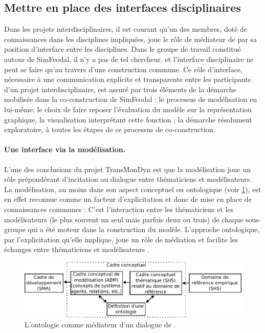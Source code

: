 \subsection{Mettre en place des interfaces disciplinaires\label{subsec:interfaces}}

Dans les projets interdisciplinaires, il est courant qu'un des membres, doté de connaissances dans les disciplines impliquées, joue le rôle de médiateur de par sa position d'interface entre les disciplines.
Dans le groupe de travail constitué autour de SimFeodal, il n'y a pas de tel chercheur, et l'interface disciplinaire ne peut se faire qu'au travers d'une construction commune.
Ce rôle d'interface, nécessaire à une communication explicite et transparente entre les participants d'un projet interdisciplinaire, est assuré par trois éléments de la démarche mobilisée dans la co-construction de SimFeodal :
le processus de modélisation en lui-même;
le choix de faire reposer l'évaluation du modèle sur la représentation graphique, la visualisation interprétant cette fonction ;
la démarche résolument exploratoire, à toutes les étapes de ce processus de co-construction.

\paragraph{Une interface via la modélisation.}

L'une des conclusions du projet TransMonDyn est que la modélisation joue un rôle prépondérant d'incitation au dialogue entre thématiciens et modélisateurs.
La modélisation, au moins dans son aspect conceptuel ou ontologique (voir \cref{fig:ontologie-mediateur}), est en effet reconnue comme un facteur d'explicitation et donc de mise en place de connaissances communes :
\og C'est l'interaction entre les thématiciens et les modélisateurs (le plus souvent un seul mais parfois deux ou trois) de chaque sous-groupe qui a été moteur dans la construction du modèle.
\textelp{}
L'approche ontologique, par l'explicitation qu'elle implique, joue un rôle de médiation et facilite les échanges entre thématiciens et modélisateurs \fg{} \autocite[458]{sanders_points_2018}.

\begin{figure}[H]
	\centering
	\includegraphics[width=\linewidth]{img/schema_phan.pdf}
	\caption{\og L'ontologie comme médiateur d'un dialogue \fg{} de \textcite[fig. 2.7, \ppno~68]{phan_ontologies_2014}.}
	\label{fig:ontologie-mediateur}
\end{figure}

